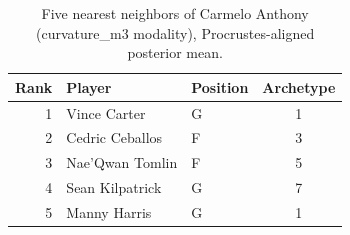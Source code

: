 \begin{table}[htbp]
  \centering\small
  \begin{tabular}{rllc}
    \toprule
    Rank & Player & Position & Archetype \\
    \midrule
    1 & Vince Carter & G & 1 \\
    2 & Cedric Ceballos & F & 3 \\
    3 & Nae'Qwan Tomlin & F & 5 \\
    4 & Sean Kilpatrick & G & 7 \\
    5 & Manny Harris & G & 1 \\
    \bottomrule
  \end{tabular}
  \caption{Five nearest neighbors of Carmelo Anthony (curvature_m3 modality), Procrustes-aligned posterior mean.}
  \label{tab:Carmelo_Anthony_neighbors_curvature_m3}
\end{table}


